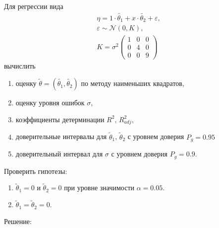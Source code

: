 \documentclass[a4paper,12pt]{article}
\newcommand{\solution}{Решение:\par}
\begin{document}
Для регрессии вида
\begin{gather*}
    \eta = 1 \cdot \widetilde{\theta_1} + x \cdot \widetilde{\theta_2} + \varepsilon , \\
    \varepsilon \sim \mathcal{N}(0, K), \\
    K
    = \sigma^2
    \begin{pmatrix}
        1 & 0 & 0 \\
        0 & 4 & 0 \\
        0 & 0 & 9
    \end{pmatrix}
\end{gather*}
вычислить
\begin{enumerate}
    \item оценку $\widetilde{\theta} = (\widetilde{\theta_1}, \widetilde{\theta_2})$ по методу наименьших квадратов,
    \item оценку уровня ошибок $\sigma$,
    \item коэффициенты детерминации $R^2$, $R_{adj}^2$,
    \item доверительные интервалы для $\widetilde{\theta}_1$, $\widetilde{\theta}_2$ с уровнем доверия $P_g = 0.95$
    \item доверительный интервал для $\sigma$ с уровнем доверия $P_g = 0.9$.
\end{enumerate}

Проверить гипотезы:
\begin{enumerate}
    \item $\widetilde{\theta}_1 = 0$ и $\widetilde{\theta}_2 = 0$ при уровне значимости $\alpha = 0.05$.
    \item $\widetilde{\theta}_1 = \widetilde{\theta}_2 = 0$.
\end{enumerate}

\solution
\end{document}

